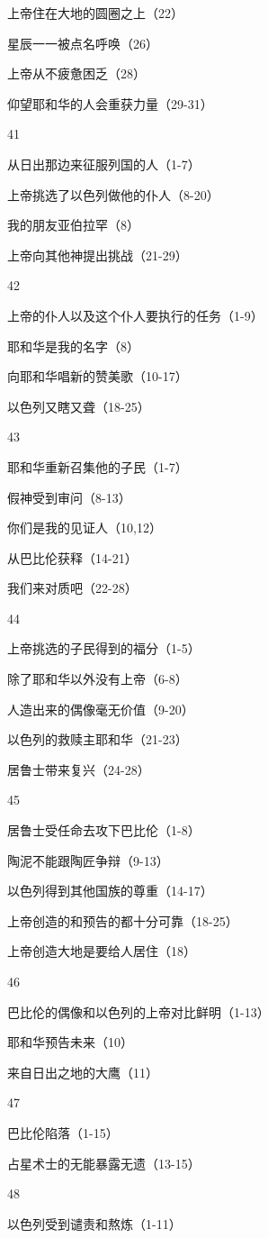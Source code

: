 上帝住在大地的圆圈之上（22）

星辰一一被点名呼唤（26）

上帝从不疲惫困乏（28）

仰望耶和华的人会重获力量（29-31）

41

从日出那边来征服列国的人（1-7）

上帝挑选了以色列做他的仆人（8-20）

我的朋友亚伯拉罕（8）

上帝向其他神提出挑战（21-29）

42

上帝的仆人以及这个仆人要执行的任务（1-9）

耶和华是我的名字（8）

向耶和华唱新的赞美歌（10-17）

以色列又瞎又聋（18-25）

43

耶和华重新召集他的子民（1-7）

假神受到审问（8-13）

你们是我的见证人（10,12）

从巴比伦获释（14-21）

我们来对质吧（22-28）

44

上帝挑选的子民得到的福分（1-5）

除了耶和华以外没有上帝（6-8）

人造出来的偶像毫无价值（9-20）

以色列的救赎主耶和华（21-23）

居鲁士带来复兴（24-28）

45

居鲁士受任命去攻下巴比伦（1-8）

陶泥不能跟陶匠争辩（9-13）

以色列得到其他国族的尊重（14-17）

上帝创造的和预告的都十分可靠（18-25）

上帝创造大地是要给人居住（18）

46

巴比伦的偶像和以色列的上帝对比鲜明（1-13）

耶和华预告未来（10）

来自日出之地的大鹰（11）

47

巴比伦陷落（1-15）

占星术士的无能暴露无遗（13-15）

48

以色列受到谴责和熬炼（1-11）

